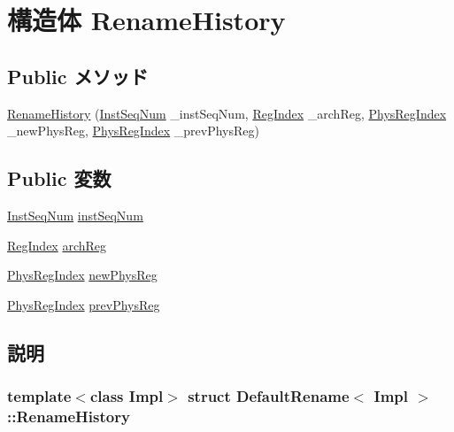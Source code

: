 \hypertarget{structDefaultRename_1_1RenameHistory}{
\section{構造体 RenameHistory}
\label{structDefaultRename_1_1RenameHistory}
}
\subsection*{Public メソッド}
\begin{DoxyCompactItemize}
\item 
\hyperlink{structDefaultRename_1_1RenameHistory_a5fc311f775dc87c62fc03af784ab25d0}{RenameHistory} (\hyperlink{inst__seq_8hh_a258d93d98edaedee089435c19ea2ea2e}{InstSeqNum} \_\-instSeqNum, \hyperlink{classDefaultRename_a36d25e03e43fa3bb4c5482cbefe5e0fb}{RegIndex} \_\-archReg, \hyperlink{o3_2comm_8hh_a5ec29599c4bc29a3054c451674969e7b}{PhysRegIndex} \_\-newPhysReg, \hyperlink{o3_2comm_8hh_a5ec29599c4bc29a3054c451674969e7b}{PhysRegIndex} \_\-prevPhysReg)
\end{DoxyCompactItemize}
\subsection*{Public 変数}
\begin{DoxyCompactItemize}
\item 
\hyperlink{inst__seq_8hh_a258d93d98edaedee089435c19ea2ea2e}{InstSeqNum} \hyperlink{structDefaultRename_1_1RenameHistory_a901e3e07a1012b00cd5009167182714b}{instSeqNum}
\item 
\hyperlink{classDefaultRename_a36d25e03e43fa3bb4c5482cbefe5e0fb}{RegIndex} \hyperlink{structDefaultRename_1_1RenameHistory_af2dcd1f086448036cd37ed6b07aef4a9}{archReg}
\item 
\hyperlink{o3_2comm_8hh_a5ec29599c4bc29a3054c451674969e7b}{PhysRegIndex} \hyperlink{structDefaultRename_1_1RenameHistory_affb5690b8bee99a204256e0b772f51ac}{newPhysReg}
\item 
\hyperlink{o3_2comm_8hh_a5ec29599c4bc29a3054c451674969e7b}{PhysRegIndex} \hyperlink{structDefaultRename_1_1RenameHistory_a8c356dbfbd6eb1576b5dcd8ac690497c}{prevPhysReg}
\end{DoxyCompactItemize}


\subsection{説明}
\subsubsection*{template$<$class Impl$>$ struct DefaultRename$<$ Impl $>$::RenameHistory}

